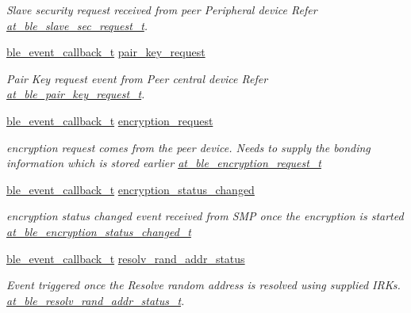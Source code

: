 \begin{DoxyCompactItemize}
\begin{DoxyCompactList}\small\item\em Slave security request received from peer Peripheral device Refer \mbox{\hyperlink{structat__ble__slave__sec__request__t}{at\+\_\+ble\+\_\+slave\+\_\+sec\+\_\+request\+\_\+t}}. \end{DoxyCompactList}\item 
\mbox{\hyperlink{ble__manager_8h_a04ce4bb8cb8282f2762e3924b1773cc9}{ble\+\_\+event\+\_\+callback\+\_\+t}} \mbox{\hyperlink{structble__gap__event__cb_a8b0be84aceb66871327bec983a6d420d}{pair\+\_\+key\+\_\+request}}
\begin{DoxyCompactList}\small\item\em Pair Key request event from Peer central device Refer \mbox{\hyperlink{structat__ble__pair__key__request__t}{at\+\_\+ble\+\_\+pair\+\_\+key\+\_\+request\+\_\+t}}. \end{DoxyCompactList}\item 
\mbox{\hyperlink{ble__manager_8h_a04ce4bb8cb8282f2762e3924b1773cc9}{ble\+\_\+event\+\_\+callback\+\_\+t}} \mbox{\hyperlink{structble__gap__event__cb_abb7e482061d1e122de5ef2e8605c14f8}{encryption\+\_\+request}}
\begin{DoxyCompactList}\small\item\em encryption request comes from the peer device. Needs to supply the bonding information which is stored earlier \mbox{\hyperlink{structat__ble__encryption__request__t}{at\+\_\+ble\+\_\+encryption\+\_\+request\+\_\+t}} \end{DoxyCompactList}\item 
\mbox{\hyperlink{ble__manager_8h_a04ce4bb8cb8282f2762e3924b1773cc9}{ble\+\_\+event\+\_\+callback\+\_\+t}} \mbox{\hyperlink{structble__gap__event__cb_af2a39ef3c65d5a624220c969a9a5beb4}{encryption\+\_\+status\+\_\+changed}}
\begin{DoxyCompactList}\small\item\em encryption status changed event received from S\+MP once the encryption is started \mbox{\hyperlink{structat__ble__encryption__status__changed__t}{at\+\_\+ble\+\_\+encryption\+\_\+status\+\_\+changed\+\_\+t}} \end{DoxyCompactList}\item 
\mbox{\hyperlink{ble__manager_8h_a04ce4bb8cb8282f2762e3924b1773cc9}{ble\+\_\+event\+\_\+callback\+\_\+t}} \mbox{\hyperlink{structble__gap__event__cb_afae8e9c934def7a93731076e226f8fa2}{resolv\+\_\+rand\+\_\+addr\+\_\+status}}
\begin{DoxyCompactList}\small\item\em Event triggered once the Resolve random address is resolved using supplied I\+RK\textquotesingle{}s. \mbox{\hyperlink{structat__ble__resolv__rand__addr__status__t}{at\+\_\+ble\+\_\+resolv\+\_\+rand\+\_\+addr\+\_\+status\+\_\+t}}. \end{DoxyCompactList}\item 

\end{DoxyCompactItemize}

